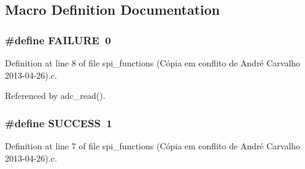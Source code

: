 \subsection{Macro Definition Documentation}
\hypertarget{spi__functions_01_07C_xC3_xB3pia_01em_01conflito_01de_01Andr_xC3_xA9_01Carvalho_012013-04-26_08_8c_a6d58f9ac447476b4e084d7ca383f5183}{
\subsubsection[{F\-A\-I\-L\-U\-R\-E}]{\setlength{\rightskip}{0pt plus 5cm}\#define F\-A\-I\-L\-U\-R\-E~0}}\label{spi__functions_01_07C_xC3_xB3pia_01em_01conflito_01de_01Andr_xC3_xA9_01Carvalho_012013-04-26_08_8c_a6d58f9ac447476b4e084d7ca383f5183}


Definition at line 8 of file spi\-\_\-functions (\-Cópia em conflito de André Carvalho 2013-\/04-\/26).\-c.



Referenced by adc\-\_\-read().

\hypertarget{spi__functions_01_07C_xC3_xB3pia_01em_01conflito_01de_01Andr_xC3_xA9_01Carvalho_012013-04-26_08_8c_aa90cac659d18e8ef6294c7ae337f6b58}{
\subsubsection[{S\-U\-C\-C\-E\-S\-S}]{\setlength{\rightskip}{0pt plus 5cm}\#define S\-U\-C\-C\-E\-S\-S~1}}\label{spi__functions_01_07C_xC3_xB3pia_01em_01conflito_01de_01Andr_xC3_xA9_01Carvalho_012013-04-26_08_8c_aa90cac659d18e8ef6294c7ae337f6b58}


Definition at line 7 of file spi\-\_\-functions (\-Cópia em conflito de André Carvalho 2013-\/04-\/26).\-c.



